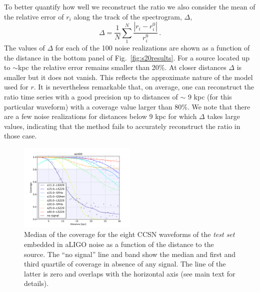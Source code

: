 To better quantify how well we reconstruct the ratio we also consider  the mean of the relative error of $r_i$ along 
the track of the spectrogram, $\Delta$,  
\begin{equation}
\Delta=\frac{1}{N}\sum_1^N\frac{|r_i-r_i^0|}{r_i^0}\,.
\end{equation}
The values of $\Delta$ for each of the 100 noise realizations are shown as a function of the distance
in the bottom panel of Fig.~\ref{fig:s20results}. For a source located up to $\sim$\unit[9]{kpc} the relative error
remains smaller than 20\%. At closer distances $\Delta$ is smaller but it does not vanish. This reflects the approximate nature of the model used for $r$. It is nevertheless remarkable that, on average, one can reconstruct the ratio time series with a good
precision up to distances of $\sim$ 9 kpc (for this particular waveform) with a coverage value
larger than 80\%. We note that there are a few noise realizations for distances below 9 kpc for which
$\Delta$ takes large values, indicating that the method fails to accurately reconstruct the ratio in those case. 

\begin{figure}[t]
  \centering
  \includegraphics[width=0.5\textwidth]{plots/aLIGO_coverage_allwvfs}
 \caption{Median of the coverage for the eight CCSN waveforms of the {\it test set} embedded in aLIGO noise as a function of the  distance to the source. The ``no signal'' line and band show the median and first and third quartile of coverage in absence of any signal. The line of the latter is zero and overlaps with the horizontal axis (see main text for details). } \label{fig:aLIGO_cov_allwvf}
\end{figure}


